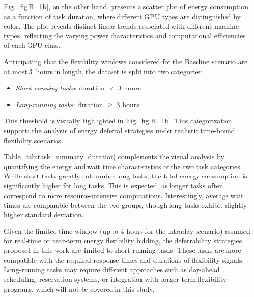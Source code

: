 \documentclass[preprint,12pt]{elsarticle}
\begin{document}
Fig. \ref{fig:B_1b}, on the other hand, presents a scatter plot of energy consumption as a function of task duration, where different GPU types are distinguished by color. The plot reveals distinct linear trends associated with different machine types, reflecting the varying power characteristics and computational efficiencies of each GPU class.

Anticipating that the flexibility windows considered for the Baseline scenario are at most 3~hours in length, the dataset is split into two categories:
\begin{itemize}
    \item \textit{Short-running tasks}: duration $<$ 3 hours
    \item \textit{Long-running tasks}: duration $\geq$ 3 hours
\end{itemize}

This threshold is visually highlighted in Fig. \ref{fig:B_1b}. This categorization supports the analysis of energy deferral strategies under realistic time-bound flexibility scenarios.

Table~\ref{tab:task_summary_duration} complements the visual analysis by quantifying the energy and wait time characteristics of the two task categories. While short tasks greatly outnumber long tasks, the total energy consumption is significantly higher for long tasks. This is expected, as longer tasks often correspond to more resource-intensive computations. Interestingly, average wait times are comparable between the two groups, though long tasks exhibit slightly higher standard deviation.

Given the limited time window (up to 4 hours for the Intraday scenario) assumed for real-time or near-term energy flexibility bidding, the deferrability strategies proposed in this work are limited to short-running tasks. These tasks are more compatible with the required response times and durations of flexibility signals. Long-running tasks may require different approaches such as day-ahead scheduling, reservation systems, or integration with longer-term flexibility programs, which will not be covered in this study.
\end{document}
